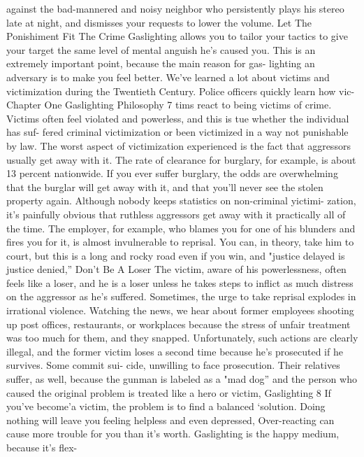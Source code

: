 \documentclass{book}
\begin{document}
against the bad-mannered and noisy neighbor who persistently 
plays his stereo late at night, and dismisses your requests to 
lower the volume. 
Let The Ponishiment Fit The Crime 
Gaslighting allows you to tailor your tactics to give your 
target the same level of mental anguish he's caused you. This is 
an extremely important point, because the main reason for gas- 
lighting an adversary is to make you feel better. 
We've learned a lot about victims and victimization during 
the Twentieth Century. Police officers quickly learn how vic- 
Chapter One 
Gaslighting Philosophy 
7 
tims react to being victims of crime. Victims often feel violated 
and powerless, and this is tue whether the individual has suf- 
fered criminal victimization or been victimized in a way not 
punishable by law. 
The worst aspect of victimization experienced is the fact 
that aggressors usually get away with it. The rate of clearance 
for burglary, for example, is about 13 percent nationwide. If 
you ever suffer burglary, the odds are overwhelming that the 
burglar will get away with it, and that you'll never see the stolen 
property again. 
Although nobody keeps statistics on non-criminal yictimi- 
zation, it's painfully obvious that ruthless aggressors get away 
with it practically all of the time. The employer, for example, 
who blames you for one of his blunders and fires you for it, is 
almost invulnerable to reprisal. You can, in theory, take him to 
court, but this is a long and rocky road even if you win, and 
"justice delayed is justice denied,” 
Don't Be A Loser 
The victim, aware of his powerlessness, often feels like a 
loser, and he is a loser unless he takes steps to inflict as much 
distress on the aggressor as he's suffered. Sometimes, the urge 
to take reprisal explodes in irrational violence. Watching the 
news, we hear about former employees shooting up post offices, 
restaurants, or workplaces because the stress of unfair treatment 
was too much for them, and they snapped. Unfortunately, such 
actions are clearly illegal, and the former victim loses a second 
time because he's prosecuted if he survives. Some commit sui- 
cide, unwilling to face prosecution. Their relatives suffer, as 
well, because the gunman is labeled as a "mad dog” and the 
person who caused the original problem is treated like a hero or 
victim,    Gaslighting 
8 
If you've become’a victim, the problem is to find a balanced 
‘solution. Doing nothing will leave you feeling helpless and even 
depressed, Over-reacting can cause more trouble for you than 
it's worth. Gaslighting is the happy medium, because it’s flex- 
\end{document}
